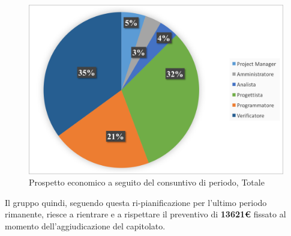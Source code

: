 \begin{figure}[H]
	\centering
	\includegraphics[scale=0.7]{Immagini/GraficiCONS/TOTCONS.png}
	\caption{Prospetto economico a seguito del consuntivo di periodo, Totale}
\end{figure}

Il gruppo quindi, seguendo questa ri-pianificazione per l'ultimo periodo rimanente, riesce a rientrare e a rispettare il preventivo di \textbf{13621€} fissato al momento dell'aggiudicazione del capitolato.